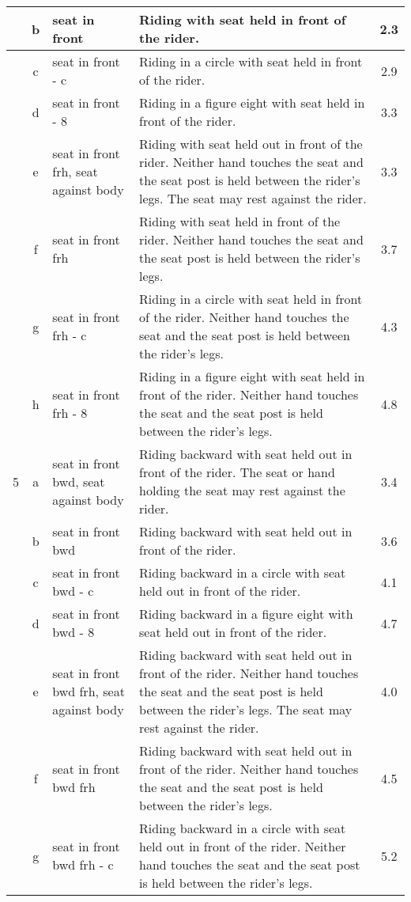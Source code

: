 \begin{longtable}{|r|c|p{4cm}|p{8cm}|c|}
\hline
  & b & seat in front & Riding with seat held in front of the rider.  & 2.3 \\ 
\hline
  & c & seat in front - c & Riding in a circle with seat held in front of the rider.  & 2.9 \\ 
\hline
  & d & seat in front - 8 & Riding in a figure eight with seat held in front of the rider.  & 3.3 \\ 
\hline
  & e & seat in front frh, seat against body  & Riding with seat held out in front of the rider. Neither hand touches the seat and the seat post is held between the rider's legs. The seat may rest against the rider. & 3.3 \\ 
\hline
  & f & seat in front frh & Riding with seat held in front of the rider. Neither hand touches the seat and the seat post is held between the rider's legs.  & 3.7 \\ 
\hline
  & g & seat in front frh - c & Riding in a circle with seat held in front of the rider. Neither hand touches the seat and the seat post is held between the rider's legs.  & 4.3 \\ 
\hline
  & h & seat in front frh - 8 & Riding in a figure eight with seat held in front of the rider. Neither hand touches the seat and the seat post is held between the rider's legs.  & 4.8 \\ 
\hline
5 & a & seat in front bwd, seat against body  & Riding backward with seat held out in front of the rider. The seat or hand holding the seat may rest against the rider. & 3.4 \\ 
\hline
  & b & seat in front bwd & Riding backward with seat held out in front of the rider. & 3.6 \\ 
\hline
  & c & seat in front bwd - c & Riding backward in a circle with seat held out in front of the rider. & 4.1 \\ 
\hline
  & d & seat in front bwd - 8 & Riding backward in a figure eight with seat held out in front of the rider. & 4.7 \\ 
\hline
  & e & seat in front bwd frh, seat against body  & Riding backward with seat held out in front of the rider. Neither hand touches the seat and the seat post is held between the rider's legs. The seat may rest against the rider.  & 4.0 \\ 
\hline
  & f & seat in front bwd frh & Riding backward with seat held out in front of the rider. Neither hand touches the seat and the seat post is held between the rider's legs. & 4.5 \\ 
\hline
  & g & seat in front bwd frh - c & Riding backward in a circle with seat held out in front of the rider. Neither hand touches the seat and the seat post is held between the rider's legs. & 5.2 \\ 

\end{longtable}
